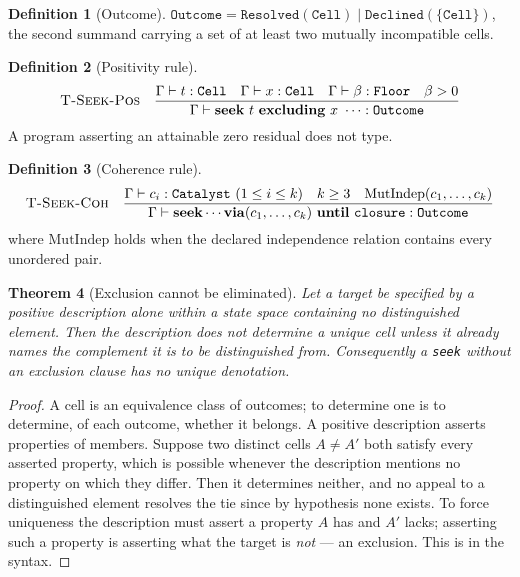 \documentclass[11pt,a4paper]{article}
\theoremstyle{clstyle}
\newtheorem{theorem}{Theorem}[section]
\theoremstyle{definition}
\newtheorem{definition}[theorem]{Definition}
\theoremstyle{remark}
\newcommand{\flo}{\beta}
\newcommand{\seekop}{\mathbf{seek}}
\newcommand{\excl}{\mathbf{excluding}}
\newcommand{\via}{\mathbf{via}}
\newcommand{\untilop}{\mathbf{until}}
\begin{document}
\begin{definition}[Outcome]
\label{def:outcome}
$\texttt{Outcome}=\texttt{Resolved}(\texttt{Cell})\mid
\texttt{Declined}(\{\texttt{Cell}\})$, the second summand carrying a set of
at least two mutually incompatible cells.
\end{definition}

\begin{definition}[Positivity rule]
\label{def:positivity}
\[
\textsc{T-Seek-Pos}\quad
\frac{\Gamma\vdash t:\texttt{Cell}\quad\Gamma\vdash x:\texttt{Cell}\quad
      \Gamma\vdash\flo:\texttt{Floor}\quad \flo>0}
     {\Gamma\vdash \seekop\ t\ \excl\ x\ \cdots:\texttt{Outcome}}
\]
A program asserting an attainable zero residual does not type.
\end{definition}

\begin{definition}[Coherence rule]
\label{def:coherence-rule}
\[
\textsc{T-Seek-Coh}\quad
\frac{\Gamma\vdash c_i:\texttt{Catalyst}\ (1\le i\le k)\quad k\ge3\quad
      \mathrm{MutIndep}(c_1,\dots,c_k)}
     {\Gamma\vdash \seekop\cdots\via(c_1,\dots,c_k)\ \untilop\ \texttt{closure}
      :\texttt{Outcome}}
\]
where $\mathrm{MutIndep}$ holds when the declared independence relation
contains every unordered pair.
\end{definition}

\begin{theorem}[Exclusion cannot be eliminated]
\label{thm:exclusion}
Let a target be specified by a positive description alone within a state
space containing no distinguished element. Then the description does not
determine a unique cell unless it already names the complement it is to be
distinguished from. Consequently a \texttt{seek} without an exclusion clause
has no unique denotation.
\end{theorem}

\begin{proof}
A cell is an equivalence class of outcomes; to determine one is to determine,
of each outcome, whether it belongs. A positive description asserts
properties of members. Suppose two distinct cells $A\neq A'$ both satisfy
every asserted property, which is possible whenever the description mentions
no property on which they differ. Then it determines neither, and no appeal
to a distinguished element resolves the tie since by hypothesis none exists.
To force uniqueness the description must assert a property $A$ has and $A'$
lacks; asserting such a property is asserting what the target is
\emph{not} --- an exclusion. This is  in the syntax.
\end{proof}
\end{document}
